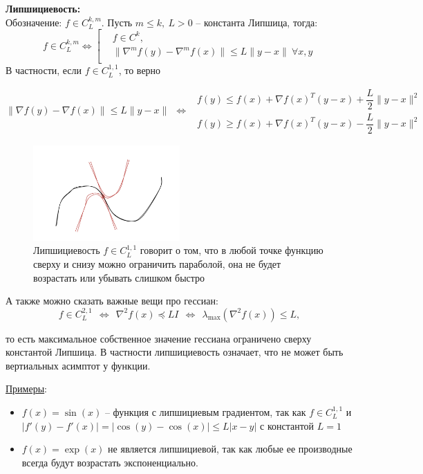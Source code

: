 \textbf{Липшициевость:}\\
Обозначение: $f\in C^{k, m}_L$. Пусть $m\leq k,\ L > 0$ -- константа Липшица, тогда:
$$f\in C^{k, m}_L \Leftrightarrow \left[
\begin{array}{ccc}
    & f\in C^k,                                                  \\
    & \|\nabla^mf(y)-\nabla^mf(x)\|\leq L\|y - x\|\ \forall x, y \\
\end{array}
\right.$$
В частности, если $f\in C^{1, 1}_L$, то верно

$$\|\nabla f(y)-\nabla f(x)\|\leq L\|y - x\|\ \  \Leftrightarrow\ \  \begin{array}{ccc}
                                                                         f(y) \leq f(x) + \nabla f(x)^T(y-x) + \dfrac{L}{2}\|y - x\|^2 \\
                                                                         f(y) \geq f(x) + \nabla f(x)^T(y-x) - \dfrac{L}{2}\|y - x\|^2
\end{array}
$$

\begin{figure}[H]
    \centering
    \includegraphics[width=0.5\textwidth]{images/lip.png}
    \caption{Липшициевость $f\in C^{1, 1}_L$ говорит о том, что в любой точке функцию сверху и снизу можно ограничить параболой, она не будет возрастать или убывать слишком быстро}
\end{figure}

А также можно сказать важные вещи про гессиан:
$$f\in C^{2, 1}_L\ \ \Leftrightarrow\ \ \nabla^2 f(x) \preccurlyeq LI\ \ \Leftrightarrow\ \ \lambda_{\max} (\nabla^2 f(x)) \leq L,$$

то есть максимальное собственное значение гессиана ограничено сверху константой Липшица.
В частности липшициевость означает, что не может быть вертиальных асимптот у функции.

\underline{Примеры}:
\begin{itemize}
    \item $f(x) = \sin(x)$ -- функция с липшициевым градиентом, так как $f\in C_L^{1, 1}$ и $|f'(y) - f'(x)| = |\cos(y) - \cos(x)| \leq L |x - y|$ с константой $L = 1$

    \item $f(x) = \exp(x)$ не является липшициевой, так как любые ее производные всегда будут возрастать экспоненциально.
\end{itemize}
\bigskip

